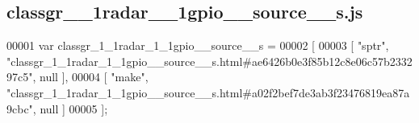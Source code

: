 \subsection{classgr\+\_\+\_\+1radar\+\_\+\_\+1gpio\+\_\+\+\_\+source\+\_\+\+\_\+s.\+js}
\label{classgr__1__1radar__1__1gpio____source____s_8js_source}

\begin{DoxyCode}
00001 var classgr_1_1radar_1_1gpio__source__s =
00002 [
00003     [ \textcolor{stringliteral}{"sptr"}, \textcolor{stringliteral}{"classgr\_1\_1radar\_1\_1gpio\_\_source\_\_s.html#ae6426b0e3f85b12c8e06c57b233297c5"}, null ],
00004     [ \textcolor{stringliteral}{"make"}, \textcolor{stringliteral}{"classgr\_1\_1radar\_1\_1gpio\_\_source\_\_s.html#a02f2bef7de3ab3f23476819ea87a9cbc"}, null ]
00005 ];
\end{DoxyCode}
